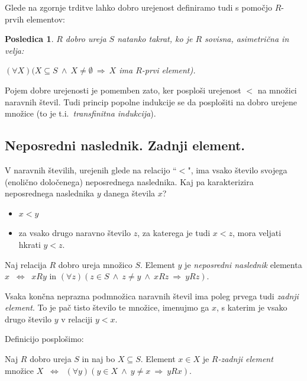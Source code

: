 \documentclass[11pt,paper=b5,footinclude,headinclude]{scrbook} %
\def\inn {{~\wedge~}}
\def\sledi {{~\Rightarrow~}}
\def\cee {{~\Leftrightarrow~}}
\newtheorem*{posledica}{Posledica}
\begin{document}
\bigskip
Glede na zgornje trditve lahko dobro urejenost definiramo tudi s pomočjo $R$-prvih elementov:

\begin{posledica}
$R$ dobro ureja $S$ natanko takrat, ko je $R$ sovisna, asimetrična in velja:

$(\forall X)(X\subseteq S\inn X\neq\emptyset\sledi X$ ima $R$-prvi element).
\end{posledica}


Pojem dobre urejenosti je pomemben zato, ker posploši urejenost $<$ na množici naravnih števil. Tudi princip popolne indukcije se da posplošiti na dobro urejene množice (to je t.i.~{\em transfinitna indukcija}).



\subsection*{Neposredni naslednik. Zadnji element.}

V naravnih številih, urejenih glede na relacijo ``$<$", ima vsako število svojega (enolično določenega) neposrednega naslednika. Kaj pa karakterizira neposrednega naslednika $y$ danega števila $x$?
\begin{itemize}
  \item $x<y$
  \item za vsako drugo naravno število $z$, za katerega je tudi $x<z$, mora veljati hkrati $y<z$.
\end{itemize}

\medskip
Naj relacija $R$ dobro ureja množico $S$. Element $y$ je {\em neposredni naslednik} elementa $x$ $\cee$ $xRy$ in $(\forall z)(z\in S\inn z\neq y\inn xRz\sledi yRz)$.

\bigskip
Vsaka končna neprazna podmnožica naravnih števil ima poleg prvega tudi {\em zadnji element}.
To je pač tisto število te množice, imenujmo ga $x$, s katerim je vsako drugo število $y$ v relaciji $y<x$.

\medskip
Definicijo posplošimo:

Naj $R$ dobro ureja $S$ in naj bo $X\subseteq S$. Element $x\in X$ je {\em $R$-zadnji element} množice $X$ $\cee$ $(\forall y)(y\in X\inn y\neq x\sledi yRx)$.

\bigskip
\end{document}

